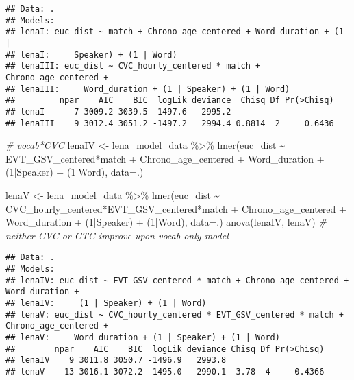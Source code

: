 \documentclass[
]{article}
\newenvironment{Shaded}{\begin{snugshade}}{\end{snugshade}}
\newcommand{\AttributeTok}[1]{\textcolor[rgb]{0.77,0.63,0.00}{#1}}
\newcommand{\CommentTok}[1]{\textcolor[rgb]{0.56,0.35,0.01}{\textit{#1}}}
\newcommand{\DecValTok}[1]{\textcolor[rgb]{0.00,0.00,0.81}{#1}}
\newcommand{\FunctionTok}[1]{\textcolor[rgb]{0.00,0.00,0.00}{#1}}
\newcommand{\NormalTok}[1]{#1}
\newcommand{\OtherTok}[1]{\textcolor[rgb]{0.56,0.35,0.01}{#1}}
\newcommand{\SpecialCharTok}[1]{\textcolor[rgb]{0.00,0.00,0.00}{#1}}
\begin{document}
\begin{verbatim}
## Data: .
## Models:
## lenaI: euc_dist ~ match + Chrono_age_centered + Word_duration + (1 | 
## lenaI:     Speaker) + (1 | Word)
## lenaIII: euc_dist ~ CVC_hourly_centered * match + Chrono_age_centered + 
## lenaIII:     Word_duration + (1 | Speaker) + (1 | Word)
##         npar    AIC    BIC  logLik deviance  Chisq Df Pr(>Chisq)
## lenaI      7 3009.2 3039.5 -1497.6   2995.2                     
## lenaIII    9 3012.4 3051.2 -1497.2   2994.4 0.8814  2     0.6436
\end{verbatim}

\begin{Shaded}
\begin{Highlighting}[]
\CommentTok{\# vocab*CVC}
\NormalTok{lenaIV }\OtherTok{\textless{}{-}}\NormalTok{ lena\_model\_data }\SpecialCharTok{\%\textgreater{}\%}
  \FunctionTok{lmer}\NormalTok{(euc\_dist }\SpecialCharTok{\textasciitilde{}}\NormalTok{ EVT\_GSV\_centered}\SpecialCharTok{*}\NormalTok{match }\SpecialCharTok{+} 
\NormalTok{         Chrono\_age\_centered }\SpecialCharTok{+}
\NormalTok{         Word\_duration }\SpecialCharTok{+} 
\NormalTok{         (}\DecValTok{1}\SpecialCharTok{|}\NormalTok{Speaker) }\SpecialCharTok{+} 
\NormalTok{         (}\DecValTok{1}\SpecialCharTok{|}\NormalTok{Word), }
       \AttributeTok{data=}\NormalTok{.) }

\NormalTok{lenaV }\OtherTok{\textless{}{-}}\NormalTok{ lena\_model\_data }\SpecialCharTok{\%\textgreater{}\%}
  \FunctionTok{lmer}\NormalTok{(euc\_dist }\SpecialCharTok{\textasciitilde{}}\NormalTok{ CVC\_hourly\_centered}\SpecialCharTok{*}\NormalTok{EVT\_GSV\_centered}\SpecialCharTok{*}\NormalTok{match }\SpecialCharTok{+} 
\NormalTok{         Chrono\_age\_centered }\SpecialCharTok{+}
\NormalTok{         Word\_duration }\SpecialCharTok{+} 
\NormalTok{         (}\DecValTok{1}\SpecialCharTok{|}\NormalTok{Speaker) }\SpecialCharTok{+} 
\NormalTok{         (}\DecValTok{1}\SpecialCharTok{|}\NormalTok{Word), }
       \AttributeTok{data=}\NormalTok{.) }
\FunctionTok{anova}\NormalTok{(lenaIV, lenaV) }\CommentTok{\# neither CVC or CTC improve upon vocab{-}only model}
\end{Highlighting}
\end{Shaded}

\begin{verbatim}
## Data: .
## Models:
## lenaIV: euc_dist ~ EVT_GSV_centered * match + Chrono_age_centered + Word_duration + 
## lenaIV:     (1 | Speaker) + (1 | Word)
## lenaV: euc_dist ~ CVC_hourly_centered * EVT_GSV_centered * match + Chrono_age_centered + 
## lenaV:     Word_duration + (1 | Speaker) + (1 | Word)
##        npar    AIC    BIC  logLik deviance Chisq Df Pr(>Chisq)
## lenaIV    9 3011.8 3050.7 -1496.9   2993.8                    
## lenaV    13 3016.1 3072.2 -1495.0   2990.1  3.78  4     0.4366
\end{verbatim}
\end{document}
